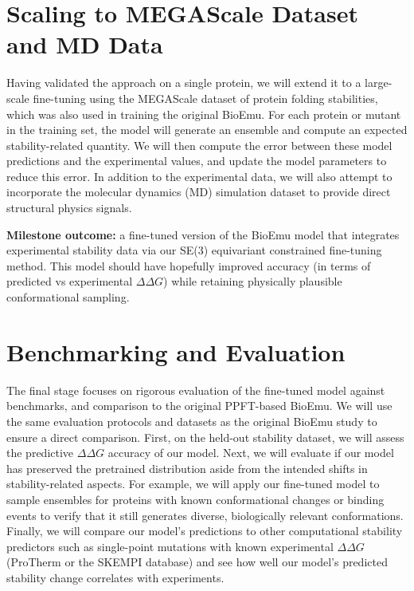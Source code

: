 \documentclass{article}
\theoremstyle{plain}
\theoremstyle{definition}
\theoremstyle{remark}
\begin{document}
\section{Scaling to MEGAScale Dataset and MD Data}

Having validated the approach on a single protein, we will extend it to a large-scale fine-tuning using the MEGAScale dataset of protein folding stabilities, which was also used in training the original BioEmu. For each protein or mutant in the training set, the model will generate an ensemble and compute an expected stability-related quantity. We will then compute the error between these model predictions and the experimental values, and update the model parameters to reduce this error. In addition to the experimental data, we will also attempt to incorporate the molecular dynamics (MD) simulation dataset to provide direct structural physics signals.

{\bf Milestone outcome:} a fine-tuned version of the BioEmu model that integrates experimental stability data via our SE(3) equivariant constrained fine-tuning method. This model should have hopefully improved accuracy (in terms of predicted vs experimental $\Delta\Delta G$) while retaining physically plausible conformational sampling.

\section{Benchmarking and Evaluation}

The final stage focuses on rigorous evaluation of the fine-tuned model against benchmarks, and comparison to the original PPFT-based BioEmu. We will use the same evaluation protocols and datasets as the original BioEmu study to ensure a direct comparison.
First, on the held-out stability dataset, we will assess the predictive $\Delta\Delta G$ accuracy of our model.
Next, we will evaluate if our model has preserved the pretrained distribution aside from the intended shifts in stability-related aspects. For example, we will apply our fine-tuned model to sample ensembles for proteins with known conformational changes or binding events to verify that it still generates diverse, biologically relevant conformations.
Finally, we will compare our model’s predictions to other computational stability predictors such as single-point mutations with known experimental $\Delta\Delta G$ (ProTherm or the SKEMPI database) and see how well our model’s predicted stability change correlates with experiments.
\end{document}
